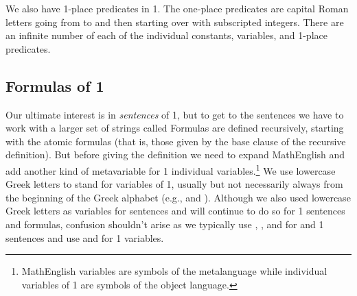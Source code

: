 We also have 1-place predicates in \GQL{}1. The one-place predicates are capital Roman letters going from  to  and then starting over with subscripted integers.  There are an infinite number of each of the individual constants, variables, and 1-place predicates. 

\subsection{Formulas of \GQL{}1}\label{Formulas of GQL1}
Our ultimate interest is in \emph{sentences} of \GQL{}1, but to get to the sentences we have to work with a larger set of strings called  
Formulas are defined recursively, starting with the atomic formulas (that is, those given by the base clause of the recursive definition).  
But before giving the definition we need to expand MathEnglish and add another kind of metavariable for \GQL{}1 individual variables.\footnote{MathEnglish variables are symbols of the metalanguage while individual variables of \GQL{}1 are symbols of the object language.} 
We use lowercase Greek letters to stand for variables of \GQL{}1, usually but not necessarily always from the beginning of the Greek alphabet (e.g., \mention{$\ALPHA$} and \mention{$\BETA$}). Although we also used lowercase Greek letters as variables for \GSL{} sentences and will continue to do so for \GQL{}1 sentences and formulas, confusion shouldn't arise as we typically use \mention{$\CAPPHI$}, \mention{$\CAPPSI$}, and \mention{$\CAPTHETA$} for \GSL{} and \GQL{}1 sentences and use \mention{$\ALPHA$} and \mention{$\BETA$} for \GQL{}1 variables. 
